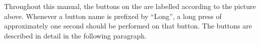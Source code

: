 Throughout this manual, the buttons on the \dap{} are labelled according to the
picture above.
%
Whenever a button name is prefixed by ``Long'', a long press of approximately
one second should be performed on that button. The buttons are described in
detail in the following paragraph.
